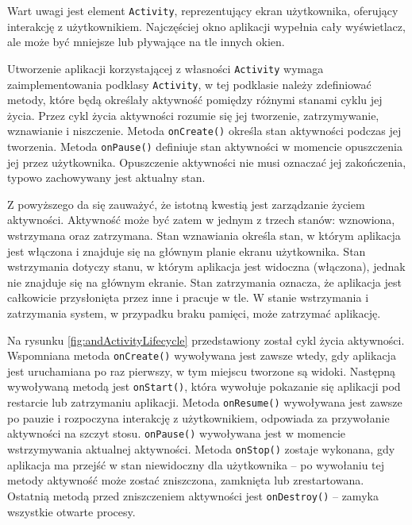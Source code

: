 \documentclass[eng,printmode,oneside]{mgr}
\begin{document}
Wart uwagi jest element \texttt{Activity}, reprezentujący ekran użytkownika,
oferujący interakcję z użytkownikiem. Najczęściej okno aplikacji wypełnia
cały wyświetlacz, ale może być mniejsze lub pływające na tle innych okien.

Utworzenie aplikacji korzystającej z własności \texttt{Activity} wymaga
zaimplementowania podklasy \texttt{Activity}, w tej podklasie należy zdefiniować metody, które będą
określały aktywność pomiędzy różnymi stanami cyklu jej życia. Przez cykl życia
aktywności rozumie się jej tworzenie, zatrzymywanie, wznawianie i niszczenie.
Metoda \texttt{onCreate()} określa stan aktywności podczas jej tworzenia. Metoda
\texttt{onPause()} definiuje stan aktywności w momencie opuszczenia jej przez
użytkownika. Opuszczenie aktywności nie musi oznaczać jej zakończenia, typowo
zachowywany jest aktualny stan.

Z powyższego da się zauważyć, że istotną kwestią jest zarządzanie życiem
aktywności. Aktywność może być zatem w jednym z trzech stanów: wznowiona, 
wstrzymana oraz zatrzymana. Stan wznawiania określa stan, w którym aplikacja
jest włączona i znajduje się na głównym planie ekranu użytkownika. Stan
wstrzymania dotyczy stanu, w którym aplikacja jest widoczna (włączona), jednak
nie znajduje się na głównym ekranie. Stan zatrzymania oznacza, że aplikacja jest
całkowicie przysłonięta przez inne i pracuje w tle. W stanie wstrzymania i
zatrzymania system, w przypadku braku pamięci, może zatrzymać aplikację.

Na rysunku \ref{fig:andActivityLifecycle} przedstawiony został cykl życia
aktywności. Wspomniana metoda \texttt{onCreate()} wywoływana jest zawsze wtedy,
gdy aplikacja jest uruchamiana po raz pierwszy, w tym miejscu tworzone są widoki.
Następną wywoływaną metodą jest \texttt{onStart()}, która wywołuje pokazanie się
aplikacji pod restarcie lub zatrzymaniu aplikacji. Metoda \texttt{onResume()} wywoływana jest
zawsze po pauzie i rozpoczyna interakcję z użytkownikiem, odpowiada za
przywołanie aktywności na szczyt stosu. \texttt{onPause()} wywoływana jest w
momencie wstrzymywania aktualnej aktywności. Metoda \texttt{onStop()} zostaje
wykonana, gdy aplikacja ma przejść w stan niewidoczny dla użytkownika -- po
wywołaniu tej metody aktywność może zostać zniszczona, zamknięta lub
zrestartowana.
Ostatnią metodą przed zniszczeniem aktywności jest \texttt{onDestroy()} -- zamyka
wszystkie otwarte procesy.
\end{document}
